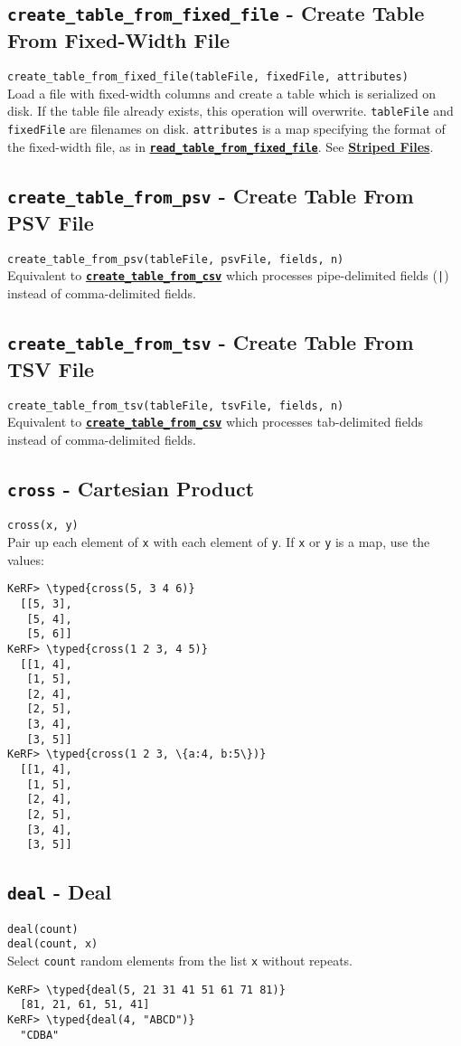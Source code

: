\documentclass{article}
\newcommand{\typed}[1]{\textcolor{TealBlue}{#1}}
\newcommand{\primdefu}[3]{\subsection{\texttt{#1} - #2}\label{prim:#3}}
\newcommand{\primu}[2]{\hyperref[prim:#2]{\textbf{\texttt{#1}}}}
\newcommand{\primdef}[2]{\primdefu{#1}{#2}{#1}}
\begin{document}
\primdefu{create\_table\_from\_fixed\_file}{Create Table From Fixed-Width File}{createTableFromFixedFile}
\texttt{create\_table\_from\_fixed\_file(tableFile, fixedFile, attributes)}\\

Load a file with fixed-width columns and create a table which is serialized on disk. If the table file already exists, this operation will overwrite. \texttt{tableFile} and \texttt{fixedFile} are filenames on disk. \texttt{attributes} is a map specifying the format of the fixed-width file, as in \primu{read\_table\_from\_fixed\_file}{readTableFromFixedFile}. See \hyperref[sec:stripeio]{\textbf{Striped Files}}.

\primdefu{create\_table\_from\_psv}{Create Table From PSV File}{createTableFromPsv}
\texttt{create\_table\_from\_psv(tableFile, psvFile, fields, n)}\\

Equivalent to \primu{create\_table\_from\_csv}{createTableFromCsv} which processes pipe-delimited fields (\texttt{|}) instead of comma-delimited fields.

\primdefu{create\_table\_from\_tsv}{Create Table From TSV File}{createTableFromTsv}
\texttt{create\_table\_from\_tsv(tableFile, tsvFile, fields, n)}\\

Equivalent to \primu{create\_table\_from\_csv}{createTableFromCsv} which processes tab-delimited fields instead of comma-delimited fields.

\pagebreak
\primdef{cross}{Cartesian Product}
\texttt{cross(x, y)}\\

Pair up each element of \texttt{x} with each element of \texttt{y}. If \texttt{x} or \texttt{y} is a map, use the values:
\begin{Verbatim}
KeRF> \typed{cross(5, 3 4 6)}
  [[5, 3], 
   [5, 4], 
   [5, 6]]
KeRF> \typed{cross(1 2 3, 4 5)}
  [[1, 4], 
   [1, 5], 
   [2, 4], 
   [2, 5], 
   [3, 4], 
   [3, 5]]
KeRF> \typed{cross(1 2 3, \{a:4, b:5\})}
  [[1, 4], 
   [1, 5], 
   [2, 4], 
   [2, 5], 
   [3, 4], 
   [3, 5]]
\end{Verbatim}

\primdef{deal}{Deal}
\texttt{deal(count)}\\
\texttt{deal(count, x)}\\

Select \texttt{count} random elements from the list \texttt{x} without repeats. 

\begin{Verbatim}
KeRF> \typed{deal(5, 21 31 41 51 61 71 81)}
  [81, 21, 61, 51, 41]
KeRF> \typed{deal(4, "ABCD")}
  "CDBA"
\end{Verbatim}
\end{document}

